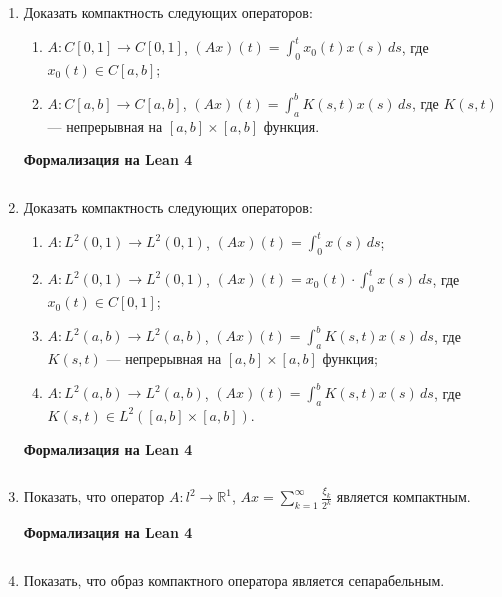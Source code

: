 \documentclass[12pt,a4paper]{article}
\begin{document}
\begin{enumerate}
\newpage
\item Доказать компактность следующих операторов:
\begin{enumerate}[label=\alph*)]
\item $A: C[0,1] \rightarrow C[0,1]$, $(Ax)(t) = \int_{0}^{t} x_{0}(t)x(s) \, ds$, где $x_{0}(t) \in C[a,b]$;
\item $A: C[a,b] \rightarrow C[a,b]$, $(Ax)(t) = \int_{a}^{b} K(s,t)x(s) \, ds$, где $K(s,t)$ — непрерывная на $[a,b] \times [a,b]$ функция.
\end{enumerate}

\begin{center}\small\textbf{Формализация на Lean 4}\end{center}
\inputminted{lean}{FunAn/Section21_CompactOperators/Task06.lean}

\newpage
\item Доказать компактность следующих операторов:
\begin{enumerate}[label=\alph*)]
\item $A: L^{2}(0,1) \rightarrow L^{2}(0,1)$, $(Ax)(t) = \int_{0}^{t} x(s) \, ds$;
\item $A: L^{2}(0,1) \rightarrow L^{2}(0,1)$, $(Ax)(t) = x_{0}(t) \cdot \int_{0}^{t} x(s) \, ds$, где $x_{0}(t) \in C[0,1]$;
\item $A: L^{2}(a,b) \rightarrow L^{2}(a,b)$, $(Ax)(t) = \int_{a}^{b} K(s,t)x(s) \, ds$, где $K(s,t)$ — непрерывная на $[a,b] \times [a,b]$ функция;
\item $A: L^{2}(a,b) \rightarrow L^{2}(a,b)$, $(Ax)(t) = \int_{a}^{b} K(s,t)x(s) \, ds$, где $K(s,t) \in L^{2}([a,b] \times [a,b])$.
\end{enumerate}

\begin{center}\small\textbf{Формализация на Lean 4}\end{center}
\inputminted{lean}{FunAn/Section21_CompactOperators/Task07.lean}

\newpage
\item Показать, что оператор $A: l^{2} \rightarrow \mathbb{R}^{1}$, $Ax = \sum_{k=1}^{\infty} \frac{\xi_{k}}{2^{k}}$ является компактным.

\begin{center}\small\textbf{Формализация на Lean 4}\end{center}
\inputminted{lean}{FunAn/Section21_CompactOperators/Task08.lean}

\newpage
\item Показать, что образ компактного оператора является сепарабельным.



\end{enumerate}
\end{document}
